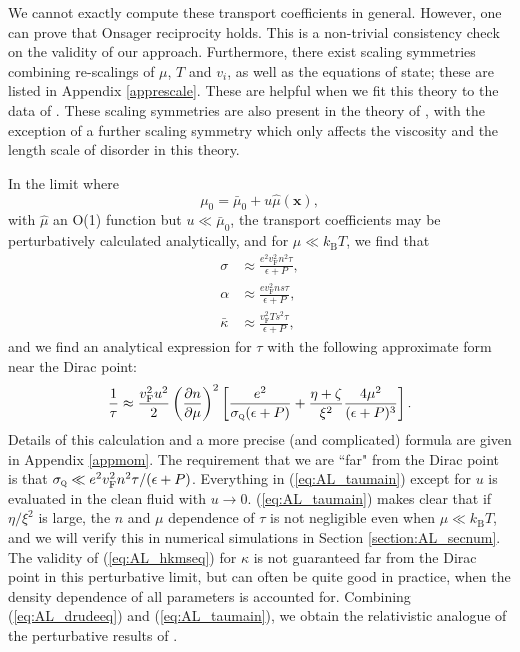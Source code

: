 We cannot exactly compute these transport coefficients in general.   However, one can prove \cite{lucas_hydrodynamic_2015} that Onsager reciprocity holds.  This is a non-trivial consistency check on the validity of our approach.   Furthermore, there exist scaling symmetries combining re-scalings of $\mu$, $T$ and $v_i$, as well as the equations of state;  these are listed in Appendix \ref{apprescale}.   These are helpful when we fit this theory to the data of \cite{crossno_observation_2016}.   These scaling symmetries are also present in the theory of \cite{hartnoll_theory_2007}, with the exception of a further scaling symmetry which only affects the viscosity and the length scale of disorder in this theory.

In the limit where \begin{equation}
\mu_0 = \bar\mu_0 +  u \hat\mu(\mathbf{x}),  \label{eq:AL_pertlimit}
\end{equation} 
with $\hat\mu$ an O(1) function but $u \ll \bar\mu_0$, the transport coefficients may be perturbatively calculated analytically, and for $\mu \ll k_{\mathrm{B}}T$,  we find that \begin{subequations}\label{eq:AL_drudeeq}\begin{align}
\sigma &\approx \frac{e^2v_{\mathrm{F}}^2n^2\tau}{\epsilon+P}, \\
\alpha &\approx \frac{ev_{\mathrm{F}}^2ns\tau}{\epsilon+P}, \\
\bar\kappa &\approx \frac{v_{\mathrm{F}}^2Ts^2\tau}{\epsilon+P},
\end{align}\end{subequations} 
and we find an analytical expression for $\tau$ with the following approximate form near the Dirac point: \begin{equation}
\frac{1}{\tau} \approx \frac{v_{\mathrm{F}}^2 u^2}{2} \left(\frac{\partial n}{\partial \mu}\right)^2 \left[\frac{e^2 }{\sigma_{\textsc{q}}(\epsilon+P)} + \frac{\eta+\zeta}{\xi^2} \frac{4\mu^2}{(\epsilon+P)^3} \right].  \label{eq:AL_taumain}
\end{equation}  Details of this calculation and a more precise (and complicated) formula are given in Appendix \ref{appmom}.    The requirement that we are ``far" from the Dirac point is that $\sigma_{\textsc{q}} \ll e^2 v_{\mathrm{F}}^2n^2\tau/(\epsilon+P)$.   Everything in (\ref{eq:AL_taumain}) except for $u$ is evaluated in the clean fluid with $u\rightarrow 0$.    (\ref{eq:AL_taumain}) makes clear that if $\eta/\xi^2$ is large, the $n$ and $\mu$ dependence of $\tau$ is not negligible even when $\mu \ll  k_{\mathrm{B}}T$, and we will verify this in numerical simulations in Section \ref{section:AL_secnum}.    The validity of (\ref{eq:AL_hkmseq}) for $\kappa$ is not guaranteed far from the Dirac point in this perturbative limit, but can often be quite good in practice, when the density dependence of all parameters is accounted for.     Combining (\ref{eq:AL_drudeeq}) and (\ref{eq:AL_taumain}), we obtain the relativistic analogue of the perturbative results of \cite{andreev_hydrodynamic_2011}. 

